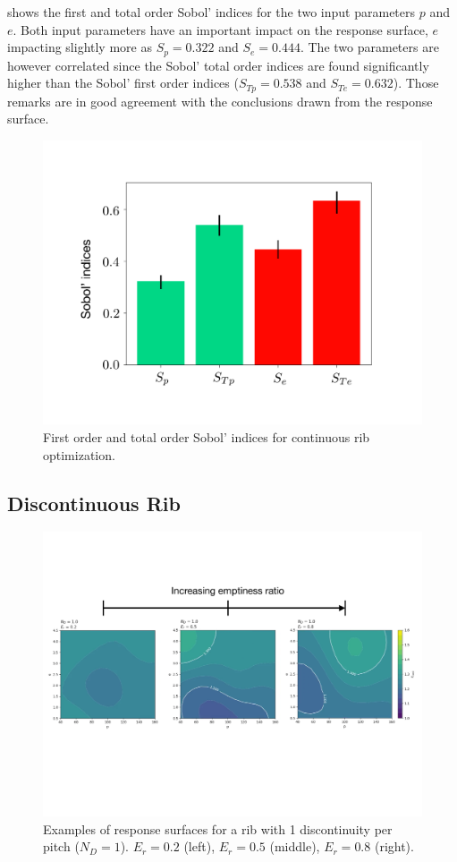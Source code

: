 shows the first and total order Sobol' indices for the two input parameters $p$ and $e$. Both input parameters have an important impact on the response surface, $e$ impacting slightly more as $S_p = 0.322$ and $S_e = 0.444$. The two parameters are however correlated since the Sobol' total order indices are found significantly higher than the Sobol' first order indices ($S_{Tp} = 0.538$ and $S_{Te} = 0.632$). Those remarks are in good agreement with the conclusions drawn from the response surface. 

\begin{figure}[h]
\centering
\includegraphics[width=0.6\linewidth,keepaspectratio]{fig/applications/optim/Sobol_continu.pdf}
\caption{First order and total order Sobol' indices for continuous rib optimization.}
\label{sensitivity2D}
\end{figure}

\subsection{Discontinuous Rib}
\label{sec:discontinuous_rib}

\begin{figure}[h!]
\centering
\includegraphics[width=\linewidth,keepaspectratio]{fig/applications/optim/GP_1ND.pdf}
\caption{Examples of response surfaces for a rib with 1 discontinuity per pitch ($N_D=1$). $E_r=0.2$ (left), $E_r=0.5$ (middle), $E_r=0.8$ (right).}
\label{1D_RS}
\end{figure}


